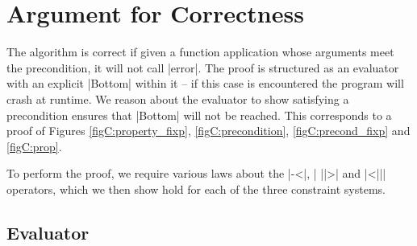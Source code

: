 \begin{comment}
-- equality substitution, replacing items
class SubstRep a b c | a c -> b, c b -> a, a b -> c where (/#) :: a -> b -> c
instance SubstRep (Prop (Sat a)) ([a], [b]) (Prop (Sat b))
instance SubstRep VarName ([VarName], [Expr]) Expr

instance Eq Val
instance Eq Expr

alt :: Alt -> Prop (Sat a)
pre' :: String -> [Expr] -> Prop (Sat Expr)
sub :: ([VarName],[Expr])

-- for BP
anys :: String -> Constraint
\end{code}

\h{#mp}\begin{code}
-- for MP
type Constraint = [ValMP]
data ValMP = [Pattern] :* [Pattern] | Any
data Pattern = Pattern CtorName [ValMP]
complete :: CtorName -> Pattern
nonRecs :: CtorName -> [Int]
merge :: [Pattern] -> [Pattern] -> [Pattern]
non :: [Int]
rec :: [Int]
\end{code}
\end{comment}


\section{Argument for Correctness}
\label{secC:correct}

\newcommand{\lemma}[1]{(\textit{#1})}
\newcommand{\theorem}[2]{#2 \hspace{5mm} \lemma{#1} \\}
\newcommand{\proof}[2][]{\paragraph{\lemma{#2} \textsf{#1}}}

The algorithm is correct if given a function application whose arguments meet the precondition, it will not call |error|. The proof is structured as an evaluator with an explicit |Bottom| within it -- if this case is encountered the program will crash at runtime. We reason about the evaluator to show satisfying a precondition ensures that |Bottom| will not be reached. This corresponds to a proof of Figures \ref{figC:property_fixp}, \ref{figC:precondition}, \ref{figC:precond_fixp} and \ref{figC:prop}.

To perform the proof, we require various laws about the |-<|, | ||>| and |<||| operators, which we then show hold for each of the three constraint systems.

\subsection{Evaluator}

